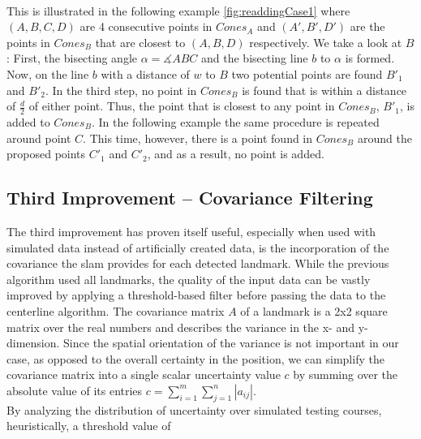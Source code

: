 \\This is illustrated in the following example \ref{fig:readdingCase1} where $(A,B,C,D)$ are 4 consecutive points in $Cones_A$ and $(A',B',D')$ are the points in $Cones_B$ that are closest to $(A,B,D)$ respectively.
We take a look at $B$: First, the bisecting angle $\alpha =\measuredangle  ABC$ and the bisecting line $b$ to $\alpha$ is formed. Now, on the line $b$ with a distance of $w$ to $B$ two potential points are found $B'_1$ and $B'_2$. In the third step, no point in $Cones_B$ is found that is within a distance of $\frac{d}{2}$ of either point. Thus, the point that is closest to any point in $Cones_B$, $B'_1$, is added to $Cones_B$.
In the following example the same procedure is repeated around point $C$.
 This time, however, there is a point found in $Cones_B$ around the proposed points $C'_1$ and $C'_2$, and as a result, no point is added.
\subsection{Third Improvement – Covariance Filtering}
The third improvement has proven itself useful, especially when used with simulated data instead of artificially created data, is the incorporation of the covariance the \ac{slam} provides for each detected landmark. While the previous algorithm used all landmarks, the quality of the input data can be vastly improved by applying a threshold-based filter before passing the data to the centerline algorithm. The covariance matrix $A$ of a landmark is a 2x2 square matrix over the real numbers and describes the variance in the x- and y-dimension. Since the spatial orientation of the variance is not important in our case, as opposed to the overall certainty in the position, we can simplify the covariance matrix into a single scalar uncertainty value $c$ by summing over the absolute value of its entries $c = \sum_{i=1}^m \sum_{j=1}^n |a_{ij}|$.\\
By analyzing the distribution of uncertainty over simulated testing courses, heuristically, a threshold value of

